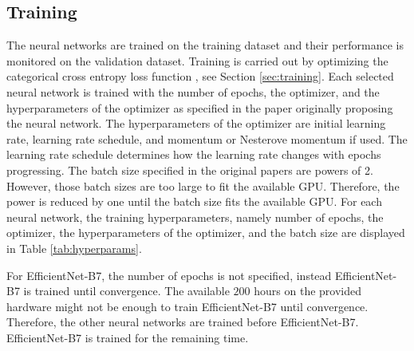 \subsection{Training}%
The neural networks are trained on the training dataset and their performance is monitored on the validation dataset.
Training is carried out by optimizing the categorical cross entropy loss function \autocites{Michelucci.2019}{ElAmir.2020}{Singh.2020}, see Section \ref{sec:training}. Each selected neural network is trained with the number of epochs, the optimizer, and the hyperparameters of the optimizer as specified in the paper originally proposing the neural network.
The hyperparameters of the optimizer are initial learning rate, learning rate schedule, and momentum or Nesterove momentum if used. The learning rate schedule determines how the learning rate changes with epochs progressing.
The batch size specified in the original papers are powers of 2. However, those batch sizes are too large to fit the available GPU. Therefore, the power is reduced by one until the batch size fits the available GPU. For each neural network, the training hyperparameters, namely number of epochs, the optimizer, the hyperparameters of the optimizer, and the batch size are displayed in Table \ref{tab:hyperparams}. \autocites{Simonyan.2014}{He.2016}{Xie.2017}{Huang.2017}{Tan.2019}
\par
For EfficientNet-B7, the number of epochs is not specified, instead EfficientNet-B7 is trained until convergence. \autocite{Tan.2019} The available $200$ hours on the provided hardware might not be enough to train EfficientNet-B7 until convergence. Therefore, the other neural networks are trained before EfficientNet-B7. EfficientNet-B7 is trained for the remaining time.
